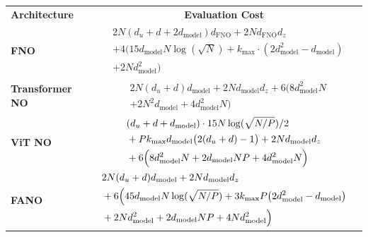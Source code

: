\documentclass[twoside]{article}
\newcommand{\1}{\mathbbm{1}}
\begin{document}
\begin{table}[htbp]
    \centering
    \begin{tabular}{|l|c|c|}
        \hline
        \cellcolor{gray!30}\textbf{Architecture} & \cellcolor{gray!30}\textbf{Evaluation Cost}  \\
        \hhline{|===|}
        \textbf{FNO} & $\begin{aligned}
            &2N(d_u+d+2d_{\textrm{model}})d_{\textrm{FNO}} +2Nd_{\textrm{FNO}}d_z \\
            &+4\bigl(15d_{\textrm{model}}N\log(\sqrt{N})+k_{\textrm{max}}\cdot(2d^2_{\textrm{model}}-d_{\textrm{model}})\\
            &+2Nd^2_{\textrm{model}}\bigr)
            \end{aligned}$\\
        \hline
        \textbf{Transformer NO}&  $\begin{aligned}
            &2N(d_u+d)d_{\textrm{model}} +2Nd_{\textrm{model}}d_z +6\bigl(8d^2_{\textrm{model}}N \\&+2N^2d_{\textrm{model}}
            +4d^2_{\textrm{model}}N\bigl)
            \end{aligned}$ \\
        \hline
        \textbf{ViT NO}& $ \begin{aligned}
            &(d_u+d+d_{\textrm{model}})\cdot 15N\log (\sqrt{N/P})/2\\
            &+Pk_{\textrm{max}}d_{\textrm{model}}\bigl(2(d_u+d)-1 \bigr)+2Nd_{\textrm{model}}d_z\\
            &+6\Bigl( 8d^2_{\textrm{model}}N+2d_{\textrm{model}}NP+4d^2_{\textrm{model}}N\Bigr)\\
        \end{aligned}$
        \\
        \hline
        \textbf{FANO}& $ \begin{aligned}
            &2N(d_u+d)d_{\textrm{model}} +2Nd_{\textrm{model}}d_z\\
            &+6\Bigl( 45d_{\textrm{model}}N\log(\sqrt{N/P})+3k_{\textrm{max}}P\bigl(2d^2_{\textrm{model}}-d_{\textrm{model}} \bigr)\\
            &+2Nd^2_{\textrm{model}}+2d_{\textrm{model}}NP +4Nd^2_{\textrm{model}}\Bigr)\\
        \end{aligned}$ \\

\end{tabular}
\end{table}
\end{document}
